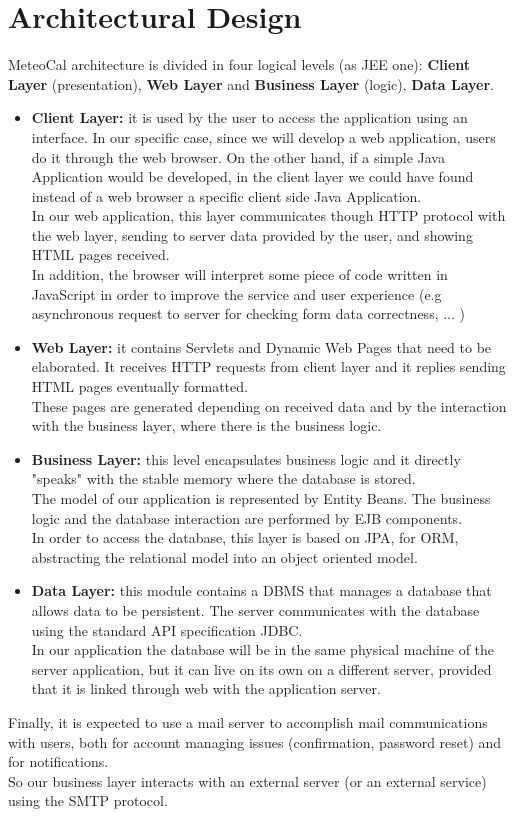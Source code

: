 \documentclass[12pt]{book}
\begin{document}
\section{Architectural Design}
MeteoCal architecture is divided in four logical levels (as JEE one): \textbf{Client Layer} (presentation), \textbf{Web Layer} and \textbf{Business Layer} (logic), \textbf{Data Layer}. 
\begin{itemize}
\item{\textbf{Client Layer: }} it is used by the user to access the application using an interface. In our specific case, since we will develop a web application, users do it through the web browser. On the other hand, if a simple Java Application would be developed, in the client layer we could have found instead of a web browser a specific client side Java Application. \\
In our web application, this layer communicates though HTTP protocol with the web layer, sending to server data provided by the user, and showing  HTML pages received. \\
In addition, the browser will interpret some piece of code written in JavaScript in order to improve the service and user experience (e.g asynchronous request to server for checking form data correctness, ... )\\
\item{\textbf{Web Layer: }} it contains Servlets and Dynamic Web Pages that need to be elaborated. It receives HTTP requests from client layer and it replies sending HTML pages eventually formatted. \\
These pages are generated depending on received data and by the interaction with the business layer, where there is the business logic. 
\item{\textbf{Business Layer: }} this level encapsulates business logic and it directly "speaks" with the stable memory where the database is stored. \\ The model of our application is represented by Entity Beans. The business logic and the database interaction are performed by EJB components. \\
In order to access the database, this layer is based on JPA, for ORM, abstracting the relational model into an object oriented model. \\
\item{\textbf{Data Layer: }} this module contains a DBMS that manages a database that allows data to be persistent. The server communicates with the database using the standard API specification JDBC.\\ In our application the database will be in the same physical machine of the server application, but it can live on its own on a different server, provided that it is linked through web with the application server. \\
\end{itemize}
Finally, it is expected to use a mail server to accomplish mail communications with users, both for account managing issues (confirmation, password reset) and for notifications. \\ So our business layer interacts with an external server (or an external service) using the SMTP protocol. \\
\end{document}
